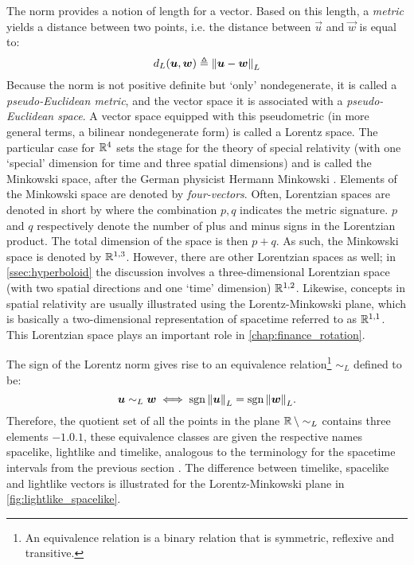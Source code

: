The norm provides a notion of length for a vector. Based on this length, a \emph{metric} yields a distance between two points, i.e. the distance between \(\vec{u}\) and \(\vec{w}\) is equal to:
\[
     d_L(\vb*{u}, \vb*{w}) \triangleq \norm{\vb*{u} - \vb*{w}}_L
\] 
Because the norm is not positive definite but `only' nondegenerate, it is called a \emph{pseudo-Euclidean metric}, and the vector space it is associated with a \emph{pseudo-Euclidean space}. A vector space equipped with this pseudometric (in more general terms, a bilinear nondegenerate form) is called a Lorentz space. The particular case for \(\mathbb{R}^4\) sets the stage for the theory of special relativity (with one `special' dimension for time and three spatial dimensions) and is called the Minkowski space, after the German physicist Hermann Minkowski \cite{Catoni2008}. Elements of the Minkowski space are denoted by \emph{four-vectors}. Often, Lorentzian spaces are denoted in short by  where the combination $p,q$ indicates the metric signature. $p$ and $q$ respectively denote the number of plus and minus signs in the Lorentzian product. The total dimension of the space is then $p + q$. As such, the Minkowski space is denoted by $\mathbb{R}^{1,3}$. However, there are other Lorentzian spaces as well; in \cref{ssec:hyperboloid} the discussion involves a three-dimensional Lorentzian space (with two spatial directions and one `time' dimension) $\mathbb{R}^{1,2}$. Likewise, concepts in spatial relativity are usually illustrated using the Lorentz-Minkowski plane, which is basically a two-dimensional representation of spacetime referred to as $\mathbb{R}^{1,1}$. This Lorentzian space plays an important role in \cref{chap:finance_rotation}.

The sign of the Lorentz norm gives rise to an equivalence relation\footnote{An equivalence relation  is a binary relation that is symmetric, reflexive and transitive.}  \(\sim_L\) defined to be:
$$\vb*{u} \sim_L \vb*{w} \iff \operatorname{sgn}{\norm{\vb*{u}}}_L = \operatorname{sgn}{\norm{\vb*{w}}}_L.$$
Therefore, the quotient set of all the points in the plane \(\mathbb{R}\,\backslash\sim_L\) contains three elements \(\qty{-1, 0, 1}\), these equivalence classes are given the respective names spacelike, lightlike and timelike, analogous to the terminology for the spacetime intervals from the previous section \cite{Landau1971}. The difference between timelike, spacelike and lightlike vectors is illustrated for the Lorentz-Minkowski plane in \cref{fig:lightlike_spacelike}.

